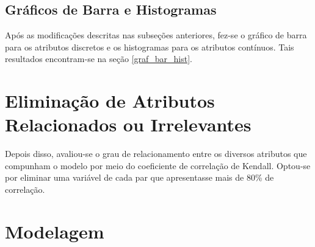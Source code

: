 \subsection{Gráficos de Barra e Histogramas}
Após as modificações descritas nas subseções anteriores, fez-se o gráfico de barra
para os atributos discretos e os histogramas para os atributos contínuos. Tais
resultados encontram-se na seção \ref{graf_bar_hist}.

\section{Eliminação de Atributos Relacionados ou Irrelevantes}

\par Depois disso, avaliou-se o grau de relacionamento entre os diversos atributos
que compunham o modelo por meio do coeficiente de correlação de Kendall. Optou-se por
eliminar uma variável de cada par que apresentasse mais de 80\% de correlação. 

\par 

\section{Modelagem}
